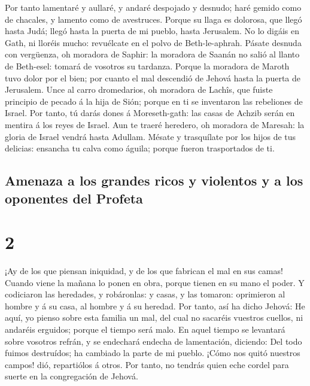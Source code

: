  Por tanto lamentaré y aullaré, y andaré despojado y
desnudo; haré gemido como de chacales, y lamento como de avestruces.
 Porque su llaga es dolorosa, que llegó hasta Judá; llegó
hasta la puerta de mi pueblo, hasta Jerusalem.  No lo
digáis en Gath, ni lloréis mucho: revuélcate en el polvo de
Beth-le-aphrah.  Pásate desnuda con vergüenza, oh
moradora de Saphir: la moradora de Saanán no salió al llanto de
Beth-esel: tomará de vosotros su tardanza.  Porque la
moradora de Maroth tuvo dolor por el bien; por cuanto el mal descendió
de Jehová hasta la puerta de Jerusalem.  Unce al carro
dromedarios, oh moradora de Lachîs, que fuiste principio de pecado á la
hija de Sión; porque en ti se inventaron las rebeliones de Israel.
 Por tanto, tú darás dones á Moreseth-gath: las casas de
Achzib serán en mentira á los reyes de Israel.  Aun te
traeré heredero, oh moradora de Maresah: la gloria de Israel vendrá
hasta Adullam.  Mésate y trasquílate por los hijos de tus
delicias: ensancha tu calva como águila; porque fueron trasportados de
ti.

\hypertarget{amenaza-a-los-grandes-ricos-y-violentos-y-a-los-oponentes-del-profeta}{%
\subsection{Amenaza a los grandes ricos y violentos y a los oponentes
del
Profeta}\label{amenaza-a-los-grandes-ricos-y-violentos-y-a-los-oponentes-del-profeta}}

\hypertarget{section-1}{%
\section{2}\label{section-1}}

 ¡Ay de los que piensan iniquidad, y de los que fabrican
el mal en sus camas! Cuando viene la mañana lo ponen en obra, porque
tienen en su mano el poder.  Y codiciaron las heredades, y
robáronlas: y casas, y las tomaron: oprimieron al hombre y á su casa, al
hombre y á su heredad.  Por tanto, así ha dicho Jehová: He
aquí, yo pienso sobre esta familia un mal, del cual no sacaréis vuestros
cuellos, ni andaréis erguidos; porque el tiempo será malo.
 En aquel tiempo se levantará sobre vosotros refrán, y se
endechará endecha de lamentación, diciendo: Del todo fuimos destruídos;
ha cambiado la parte de mi pueblo. ¡Cómo nos quitó nuestros campos! dió,
repartiólos á otros.  Por tanto, no tendrás quien eche
cordel para suerte en la congregación de Jehová.

